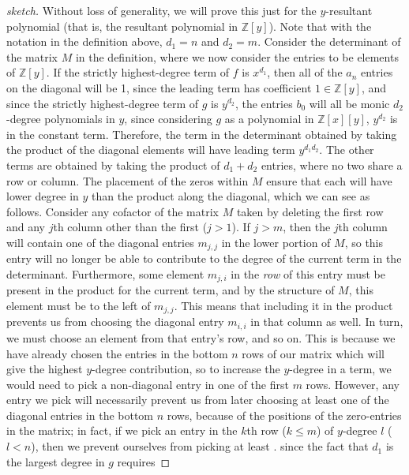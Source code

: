 \documentclass[11pt]{report}
\newcommand{\Zx}{\mathbb{Z}[x]}
\newcommand{\Zy}{\mathbb{Z}[y]}
\begin{document}
\begin{proof}[sketch]
Without loss of generality, we will prove this just for the $y$-resultant polynomial (that is, the resultant polynomial in $\Zy$). Note that with the notation in the definition above, $d_1 = n$ and $d_2=m$. Consider the determinant of the matrix $M$ in the definition, where we now consider the entries to be elements of $\Zy$. If the strictly highest-degree term of $f$ is $x^{d_1}$, then all of the $a_n$ entries on the diagonal will be 1, since the leading term has coefficient $1\in \Zy$, and since the strictly highest-degree term of $g$ is $y^{d_2}$, the entries $b_0$ will all be monic $d_2$-degree polynomials in $y$, since considering $g$ as a polynomial in $\Zx[y]$, $y^{d_2}$ is in the constant term. Therefore, the term in the determinant obtained by taking the product of the diagonal elements will have leading term $y^{d_1d_2}$. The other terms are obtained by taking the product of $d_1+d_2$ entries, where no two share a row or column. The placement of the zeros within $M$ ensure that each will have lower degree in $y$ than the product along the diagonal, which we can see as follows. Consider any cofactor of the matrix $M$ taken by deleting the first row and any $j$th column other than the first ($j>1$). If $j>m$, then the $j$th column will contain one of the diagonal entries $m_{j,j}$ in the lower portion of $M$, so this entry will no longer be able to contribute to the degree of the current term in the determinant. Furthermore, some element $m_{j,i}$ in the \emph{row} of this entry must be present in the product for the current term, and by the structure of $M$, this element must be to the left of $m_{j,j}$. This means that including it in the product prevents us from choosing the diagonal entry $m_{i,i}$ in that column as well. In turn, we must choose an element from that entry's row, and so on. This is because we have already chosen the entries in the bottom $n$ rows of our matrix which will give the highest $y$-degree contribution, so to increase the $y$-degree in a term, we would need to pick a non-diagonal entry in one of the first $m$ rows. However, any entry we pick will necessarily prevent us from later choosing at least one of the diagonal entries in the bottom $n$ rows, because of the positions of the zero-entries in the matrix; in fact, if we pick an entry in the $k$th row ($k\leq m$) of $y$-degree $l$ ($l<n$), then we prevent ourselves from picking at least .  since the fact that $d_1$ is the largest degree in $g$ requires 
\end{proof}
\end{document}
